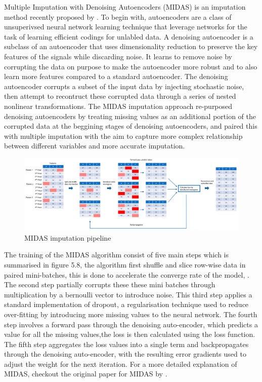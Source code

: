 \documentclass{l4proj}
\begin{document}
Multiple Imputation with Denoising Autoencoders (MIDAS) is an imputation method recently proposed by \cite{lall_robinson_2022}. To begin with, autoencoders are a class of unsuperivsed neural network learning technique that leverage networks for the task of learning efficient codings for unlabled data. A denoising autoencoder is a subclass of an autoencoder that uses dimensionality reduction to preserve the key features of the signals while discarding noise. It learns to remove noise by corrupting the data on purpose to make the autoencoder more robust and to also learn more features compared to a standard autoencoder. The denoising autoencoder corrupts a subset of the input data by injecting stochastic noise, then attempt to recontruct these corrupted data through a series of nested nonlinear transformations. The MIDAS imputation approach re-purposed denoising autoencoders by treating missing values as an additional portion of the corrupted data at the beggining stages of denoising autoencoders, and paired this with multiple imputation with the aim to capture more complex relationship between different variables and more accurate imputation.


 \begin{figure}[h!]
  \caption{MIDAS imputation pipeline}
  \includegraphics[width=\textwidth]{dissertation/Latex/images/Imputation Figures/MIDAS imputation.PNG}
\end{figure}

The training of the MIDAS algorithm consist of five main steps which is summarised in figure 5.8, the algorithm first shuffle and slice row-wise data in paired mini-batches, this is done to accelerate the converge rate of the model, \cite{lall_robinson_2022}. The second step partially corrupts these these mini batches through multiplication by a bernoulli vector to introduce noise. This third step applies a standard implementation of dropout, a regularisation technique used to reduce over-fitting by introducing more missing values to the neural network. The fourth step involves a forward pass through the denoising auto-encoder, which predicts a value for all the missing values,the loss is then calculated using the loss function. The fifth step aggregates the loss values into a single term and backpropagates through the denoising auto-encoder, with the resulting error gradients used to adjust the weight for the next iteration. For a more detailed explanation of MIDAS, checkout the original paper for MIDAS by \cite{lall_robinson_2022}.
\end{document}
